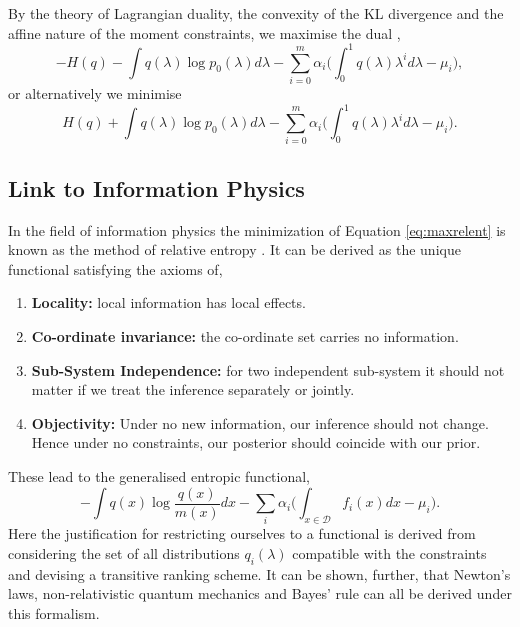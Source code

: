 \documentclass[letterpaper]{article} %
\begin{document}
By the theory of Lagrangian duality, the convexity of the KL divergence and the affine nature of the moment constraints, we maximise the dual \cite{boyd_vandenberghe_2009},
\begin{equation}
-H(q) - \int q(\lambda)\log p_{0}(\lambda)d\lambda - \sum_{i=0}^{m}\alpha_{i}\biggl(\int_{0}^{1}q(\lambda)\lambda^{i}d\lambda - \mu_{i}\biggr),
\end{equation}
or alternatively we minimise
\begin{equation}
\label{eq:maxrelent}
H(q) + \int q(\lambda)\log p_{0}(\lambda)d\lambda - \sum_{i=0}^{m}\alpha_{i}\biggl(\int_{0}^{1}q(\lambda)\lambda^{i}d\lambda - \mu_{i}\biggr).
\end{equation}

\subsection{Link to Information Physics}
In the field of information physics the minimization of Equation \eqref{eq:maxrelent} is known as the method of relative entropy \cite{caticha2012entropic}. It can be derived as the unique functional satisfying the axioms of,
\begin{enumerate}
	\item {\bfseries Locality:} local information has local effects.
	\item {\bfseries Co-ordinate invariance:} the co-ordinate set carries no information.
	\item {\bfseries Sub-System Independence:} for two independent sub-system it should not matter if we treat the inference separately or jointly.
	\item {\bfseries Objectivity:} Under no new information, our inference should not change. Hence under no constraints, our posterior should coincide with our prior.
\end{enumerate}
These lead to the generalised entropic functional,
\begin{equation}
-\int q(x)\log\frac{q(x)}{m(x)}dx - \sum_{i}\alpha_{i}\bigg(\int_{x\in \mathcal{D}}f_{i}(x)dx-\mu_{i}\bigg).
\end{equation}
Here the justification for restricting ourselves to a functional is derived from considering the set of all distributions $q_{i}(\lambda)$ compatible with the constraints and devising a transitive ranking scheme.  It can be shown, further, that Newton's laws, non-relativistic quantum mechanics and Bayes' rule can all be derived under this formalism.  
\end{document}
